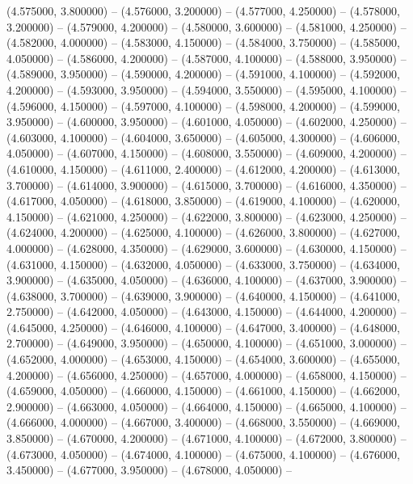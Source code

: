(4.575000, 3.800000) -- 
(4.576000, 3.200000) -- 
(4.577000, 4.250000) -- 
(4.578000, 3.200000) -- 
(4.579000, 4.200000) -- 
(4.580000, 3.600000) -- 
(4.581000, 4.250000) -- 
(4.582000, 4.000000) -- 
(4.583000, 4.150000) -- 
(4.584000, 3.750000) -- 
(4.585000, 4.050000) -- 
(4.586000, 4.200000) -- 
(4.587000, 4.100000) -- 
(4.588000, 3.950000) -- 
(4.589000, 3.950000) -- 
(4.590000, 4.200000) -- 
(4.591000, 4.100000) -- 
(4.592000, 4.200000) -- 
(4.593000, 3.950000) -- 
(4.594000, 3.550000) -- 
(4.595000, 4.100000) -- 
(4.596000, 4.150000) -- 
(4.597000, 4.100000) -- 
(4.598000, 4.200000) -- 
(4.599000, 3.950000) -- 
(4.600000, 3.950000) -- 
(4.601000, 4.050000) -- 
(4.602000, 4.250000) -- 
(4.603000, 4.100000) -- 
(4.604000, 3.650000) -- 
(4.605000, 4.300000) -- 
(4.606000, 4.050000) -- 
(4.607000, 4.150000) -- 
(4.608000, 3.550000) -- 
(4.609000, 4.200000) -- 
(4.610000, 4.150000) -- 
(4.611000, 2.400000) -- 
(4.612000, 4.200000) -- 
(4.613000, 3.700000) -- 
(4.614000, 3.900000) -- 
(4.615000, 3.700000) -- 
(4.616000, 4.350000) -- 
(4.617000, 4.050000) -- 
(4.618000, 3.850000) -- 
(4.619000, 4.100000) -- 
(4.620000, 4.150000) -- 
(4.621000, 4.250000) -- 
(4.622000, 3.800000) -- 
(4.623000, 4.250000) -- 
(4.624000, 4.200000) -- 
(4.625000, 4.100000) -- 
(4.626000, 3.800000) -- 
(4.627000, 4.000000) -- 
(4.628000, 4.350000) -- 
(4.629000, 3.600000) -- 
(4.630000, 4.150000) -- 
(4.631000, 4.150000) -- 
(4.632000, 4.050000) -- 
(4.633000, 3.750000) -- 
(4.634000, 3.900000) -- 
(4.635000, 4.050000) -- 
(4.636000, 4.100000) -- 
(4.637000, 3.900000) -- 
(4.638000, 3.700000) -- 
(4.639000, 3.900000) -- 
(4.640000, 4.150000) -- 
(4.641000, 2.750000) -- 
(4.642000, 4.050000) -- 
(4.643000, 4.150000) -- 
(4.644000, 4.200000) -- 
(4.645000, 4.250000) -- 
(4.646000, 4.100000) -- 
(4.647000, 3.400000) -- 
(4.648000, 2.700000) -- 
(4.649000, 3.950000) -- 
(4.650000, 4.100000) -- 
(4.651000, 3.000000) -- 
(4.652000, 4.000000) -- 
(4.653000, 4.150000) -- 
(4.654000, 3.600000) -- 
(4.655000, 4.200000) -- 
(4.656000, 4.250000) -- 
(4.657000, 4.000000) -- 
(4.658000, 4.150000) -- 
(4.659000, 4.050000) -- 
(4.660000, 4.150000) -- 
(4.661000, 4.150000) -- 
(4.662000, 2.900000) -- 
(4.663000, 4.050000) -- 
(4.664000, 4.150000) -- 
(4.665000, 4.100000) -- 
(4.666000, 4.000000) -- 
(4.667000, 3.400000) -- 
(4.668000, 3.550000) -- 
(4.669000, 3.850000) -- 
(4.670000, 4.200000) -- 
(4.671000, 4.100000) -- 
(4.672000, 3.800000) -- 
(4.673000, 4.050000) -- 
(4.674000, 4.100000) -- 
(4.675000, 4.100000) -- 
(4.676000, 3.450000) -- 
(4.677000, 3.950000) -- 
(4.678000, 4.050000) -- 

